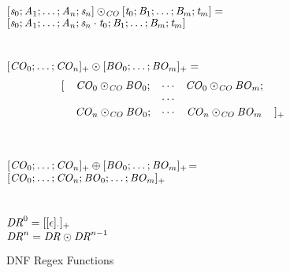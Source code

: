 \begin{figure}
\ConcatConjunct{} \OfType{} \ArrowTypeOf{\ConjunctType{}}{\ArrowTypeOf{\ConjunctType{}}{\ConjunctType{}}}\\
$[\mathit{s}_0;\mathit{A}_1;\ldots;\mathit{A}_n;\mathit{s}_n]\odot_{\mathit{CO}}[\mathit{t}_0;\mathit{B}_1;\ldots;\mathit{B}_m;\mathit{t}_m]=$\\
\hspace*{2ex}$[\mathit{s}_0;\mathit{A}_1;\ldots;\mathit{A}_n;\mathit{s}_n\cdot\mathit{t}_0;\mathit{B}_1;\ldots;\mathit{B}_m;\mathit{t}_m]$\\
\\
\ConcatDNF{} \OfType{} \ArrowTypeOf{\DNFRegexType{}}{\ArrowTypeOf{\DNFRegexType{}}{\DNFRegexType{}}}\\
$[\mathit{CO}_0;\ldots;\mathit{CO}_n]_{+}\odot[\mathit{BO}_0;\ldots;\mathit{BO}_m]_{+}=$
\[
\begin{array}{rcccl}
[ & \mathit{CO}_0\odot_{\mathit{CO}}\mathit{BO}_0; & \cdots & \mathit{CO}_0\odot_{\mathit{CO}}\mathit{BO}_m; \\
& & \cdots & \\
& \mathit{CO}_n\odot_{\mathit{CO}}\mathit{BO}_0; & \cdots & \mathit{CO}_n\odot_{\mathit{CO}}\mathit{BO}_m & ]_{+}
\end{array}
\]
\\
\OrDNF{} \OfType{} \ArrowTypeOf{\DNFRegexType{}}{\DNFRegexType{}}\\
$[\mathit{CO}_0;\ldots;\mathit{CO}_n]_{+}\oplus[\mathit{BO}_0;\ldots;\mathit{BO}_m]_{+}$=\\
\hspace*{2ex}$[\mathit{CO}_0;\ldots;\mathit{CO}_n;\mathit{BO}_0;\ldots;\mathit{BO}_m]_{+}$\\
\\
 \OfType{} \ArrowTypeOf{\DNFRegexType{}}{\DNFRegexType{}}\\
$\mathit{DR}^{0}=[[\epsilon]_{\cdot}]_{+}$\\
$\mathit{DR}^{n}=\mathit{DR}\odot\mathit{DR}^{n-1}$\\
\caption{DNF Regex Functions}
\label{fig:dnf-regex-functions}
\end{figure}
